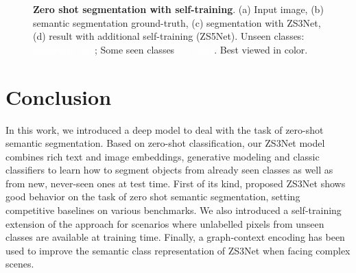\documentclass{article}
\begin{document}
\begin{figure*}[t!]
	\vspace{-0.3cm}
	\caption{\small \textbf{Zero shot segmentation with self-training}. (a) Input image, (b) semantic segmentation ground-truth, (c) segmentation with ZS3Net, (d) result with additional self-training (ZS5Net). Unseen classes:
		\setlength{\fboxsep}{1pt}\colorbox{col_bike}{\textcolor{white}{motorbike}}
		\setlength{\fboxsep}{1pt}\colorbox{col_sofa}{\textcolor{white}{sofa}};
		Some seen classes
		\setlength{\fboxsep}{1pt}\colorbox{col_car}{\textcolor{white}{car}}
		\setlength{\fboxsep}{1pt}\colorbox{col_chair}{\textcolor{white}{chair}}.
		Best viewed in color.
	}
	\vspace{-0.4cm}
	\label{fig:self_training}
\end{figure*}






 \section{Conclusion}
In this work, we introduced a deep model to deal with the task of zero-shot semantic segmentation.
Based on zero-shot classification, our ZS3Net model combines rich text and image embeddings, generative modeling and classic classifiers to learn how to segment objects from already seen classes as well as from new, never-seen ones at test time.  
First of its kind, proposed ZS3Net shows good behavior on the task of zero shot semantic segmentation, setting competitive baselines on various benchmarks.
We also introduced a self-training extension of the approach for scenarios where unlabelled pixels from unseen classes are available at training time. Finally, a graph-context encoding has been used to improve the semantic class representation of ZS3Net when facing complex scenes.  
\clearpage


{\small

}
\clearpage
\end{document}
